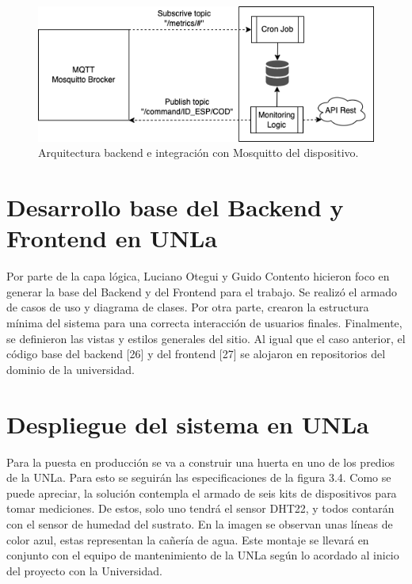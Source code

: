 \begin{figure}[htpb]
\centering 
\includegraphics[width=.9\textwidth]{./Figures/arqBE.png}
\caption{Arquitectura backend e integración con Mosquitto del dispositivo.}
\label{fig:diagBloques}
\end{figure}


\section{Desarrollo base del Backend y Frontend en UNLa}
Por parte de la capa lógica, Luciano Otegui y Guido Contento hicieron foco en generar la base del Backend y del Frontend para el trabajo. Se realizó el armado de casos de uso y diagrama de clases. Por otra parte, crearon la estructura mínima del sistema para una correcta interacción de usuarios finales. Finalmente, se definieron las vistas y estilos generales del sitio. Al igual que el caso anterior, el código base del backend [26] y del frontend [27] se alojaron en repositorios del dominio de la universidad.\\


\section{Despliegue del sistema en UNLa}

Para la puesta en producción se va a construir una huerta en uno de los predios de la UNLa. Para esto se seguirán las especificaciones de la figura 3.4. Como se puede apreciar, la solución contempla el armado de seis kits de dispositivos para tomar mediciones. De estos, solo uno tendrá el sensor DHT22, y todos contarán con el sensor de humedad del sustrato. En la imagen se observan unas líneas de color azul, estas representan la cañería de agua. Este montaje se llevará en conjunto con el equipo de mantenimiento de la UNLa según lo acordado al inicio del proyecto con la Universidad.

